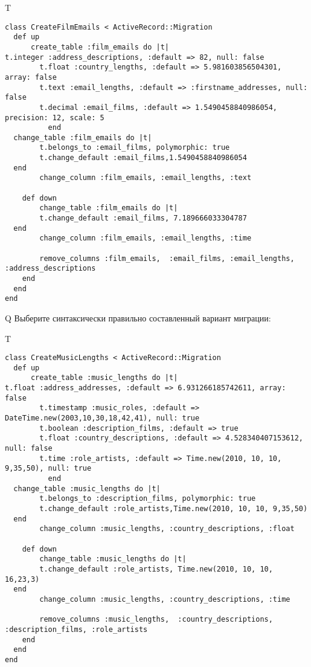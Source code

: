 T
\begin{verbatim}
class CreateFilmEmails < ActiveRecord::Migration
  def up
	  create_table :film_emails do |t|
t.integer :address_descriptions, :default => 82, null: false
		t.float :country_lengths, :default => 5.981603856504301, array: false
		t.text :email_lengths, :default => :firstname_addresses, null: false
		t.decimal :email_films, :default => 1.5490458840986054, precision: 12, scale: 5
		  end
  change_table :film_emails do |t|
		t.belongs_to :email_films, polymorphic: true
 		t.change_default :email_films,1.5490458840986054
  end
 		change_column :film_emails, :email_lengths, :text
   
	def down
		change_table :film_emails do |t|
		t.change_default :email_films, 7.189666033304787
  end
 		change_column :film_emails, :email_lengths, :time
   
		remove_columns :film_emails,  :email_films, :email_lengths, :address_descriptions 
    end 
  end
end

\end{verbatim}

Q
Выберите синтаксически правильно составленный вариант миграции:

T
\begin{verbatim}
class CreateMusicLengths < ActiveRecord::Migration
  def up
	  create_table :music_lengths do |t|
t.float :address_addresses, :default => 6.931266185742611, array: false
		t.timestamp :music_roles, :default => DateTime.new(2003,10,30,18,42,41), null: true
		t.boolean :description_films, :default => true
		t.float :country_descriptions, :default => 4.528340407153612, null: false
		t.time :role_artists, :default => Time.new(2010, 10, 10, 9,35,50), null: true
		  end
  change_table :music_lengths do |t|
		t.belongs_to :description_films, polymorphic: true
 		t.change_default :role_artists,Time.new(2010, 10, 10, 9,35,50)
  end
 		change_column :music_lengths, :country_descriptions, :float
   
	def down
		change_table :music_lengths do |t|
		t.change_default :role_artists, Time.new(2010, 10, 10, 16,23,3)
  end
 		change_column :music_lengths, :country_descriptions, :time
   
		remove_columns :music_lengths,  :country_descriptions, :description_films, :role_artists 
    end 
  end
end

\end{verbatim}


